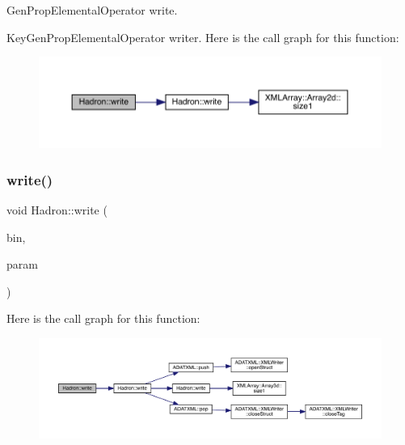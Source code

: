 Gen\+Prop\+Elemental\+Operator write. 

Key\+Gen\+Prop\+Elemental\+Operator writer. Here is the call graph for this function\+:
\nopagebreak
\begin{figure}[H]
\begin{center}
\leavevmode
\includegraphics[width=350pt]{d1/daf/namespaceHadron_af1d6496318c689e52be27a9f842ccc2d_cgraph}
\end{center}
\end{figure}
\mbox{\label{namespaceHadron_a97d7de65e3fea244c875c2cb76decfda}} 
\subsubsection{\texorpdfstring{write()}{write()}\hspace{0.1cm}{\footnotesize\ttfamily [62/95]}}
{\footnotesize\ttfamily void Hadron\+::write (\begin{DoxyParamCaption}\item[{\mbox{\hyperlink{classADATIO_1_1BinaryWriter}{Binary\+Writer}} \&}]{bin,  }\item[{const \mbox{\hyperlink{structHadron_1_1HadronAdjMapTarget__t}{Hadron\+Adj\+Map\+Target\+\_\+t}} \&}]{param }\end{DoxyParamCaption})}

Here is the call graph for this function\+:
\nopagebreak
\begin{figure}[H]
\begin{center}
\leavevmode
\includegraphics[width=350pt]{d1/daf/namespaceHadron_a97d7de65e3fea244c875c2cb76decfda_cgraph}
\end{center}
\end{figure}
\mbox{\label{namespaceHadron_af16b79349f97386286cfc1cd9dfb73f0}} 
